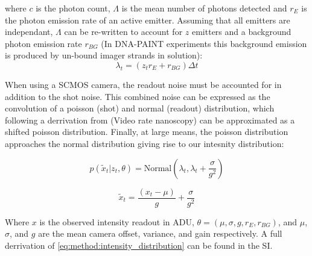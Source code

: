 where $c$ is the photon count, $\Lambda$ is the mean number of photons detected and $r_{E}$ is the photon emission rate of an active emitter.
%
Assuming that all emitters are independant, $\Lambda$ can be re-written to account for $z$ emitters and a background photon emission rate 
$r_{BG}$ (In DNA-PAINT experiments this background emission is produced by un-bound imager strands in solution):
%
\begin{equation*}
	\lambda_{t} = (z_{t} r_{E} + r_{BG})\Delta t
\end{equation*}

When using a SCMOS camera, the readout noise must be accounted for in addition to the shot noise. 
This combined noise can be expressed as the convolution of a poisson (shot) and normal (readout) distribution,
which following a derrivation from (Video rate nanoscopy) can be approximated as a shifted poisson distribution.
Finally, at large means, the poisson distribution approaches the normal distribution giving rise to our intesnity distribution:

\begin{equation}
  p(\tilde{x}_{t}| z_{t}, \theta) = \text{Normal} \left(\lambda_{t}, \lambda_{t} + \frac{\sigma}{g^{2}} \right)
  \label{eq:method:intensity_distribution}
\end{equation}

\begin{equation*}
  \tilde{x}_{t} = \frac{(x_{t} - \mu)}{g} + \frac{\sigma}{g^{2}}
\end{equation*}


Where $x$ is the observed intensity readout in ADU, $\theta = (\mu, \sigma, g, r_{E}, r_{BG})$, and $\mu$, $\sigma$,
and $g$ are the mean camera offset, variance, and gain respectively.
%
A full derrivation of \eqref{eq:method:intensity_distribution} can be found in the SI.


